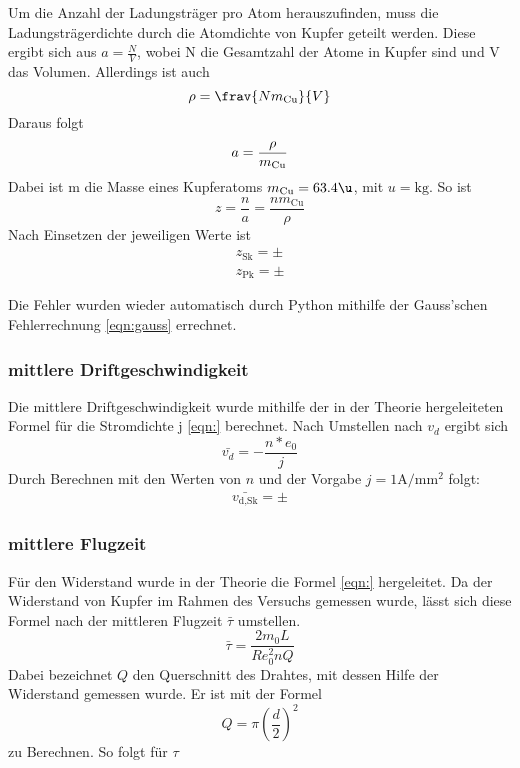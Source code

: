 Um die Anzahl der Ladungsträger pro Atom herauszufinden, muss die Ladungsträgerdichte durch 
die Atomdichte von Kupfer geteilt werden.
Diese ergibt sich aus $a = \frac{N}{V}$, wobei N die Gesamtzahl der Atome in Kupfer sind und V das Volumen. 
Allerdings ist auch 
\begin{equation}
\rho = \frav{N m_\text{Cu}}{V}
\end{equation}
Daraus folgt
\begin{equation}
a = \frac{\rho}{m_\text{Cu}} \\
\end{equation}
Dabei ist m die Masse eines Kupferatoms $m_\text{Cu} = 63.4 \si{\u}$, mit $u = \si{\kilo\g}$.
So ist
\begin{equation}
z = \frac{n}{a} = \frac{n m_\text{Cu}}{\rho}
\end{equation}
Nach Einsetzen der jeweiligen Werte ist
\begin{align*}
z_\text{Sk} = \pm \\
z_\text{Pk} = \pm
\end{align*}

Die Fehler wurden wieder automatisch durch Python mithilfe der Gauss'schen Fehlerrechnung 
\eqref{eqn:gauss} errechnet.

\subsubsection{mittlere Driftgeschwindigkeit}

Die mittlere Driftgeschwindigkeit wurde mithilfe der in der Theorie hergeleiteten
Formel für die Stromdichte j \eqref{eqn:} berechnet. Nach Umstellen nach $v_d$ ergibt sich
\begin{equation}
\bar{v_d} = - \frac{n * e_0}{j} 
\end{equation}
Durch Berechnen mit den Werten von $n$ und der Vorgabe $j = 1 \si{\ampere\per\milli\meter\squared}$
folgt:
\begin{align*}
\bar{v_\text{d,Sk}} = \pm
\end{align*}

\subsubsection{mittlere Flugzeit}

Für den Widerstand wurde in der Theorie die Formel \eqref{eqn:} hergeleitet. Da der Widerstand
von Kupfer im Rahmen des Versuchs gemessen wurde, lässt sich diese Formel nach
der mittleren Flugzeit $\bar{\tau}$ umstellen.
\begin{equation}
\bar{\tau} = \frac{2 m_0 L}{R e_0^2 n Q}
\end{equation}
Dabei bezeichnet $Q$ den Querschnitt des Drahtes, mit dessen Hilfe der Widerstand gemessen wurde.
Er ist mit der Formel
\begin{equation}
Q = \pi \left( \frac{d}{2} \right)^2
\end{equation}
zu Berechnen. So folgt für $\tau$
\begin{align*}

\end{align*}

